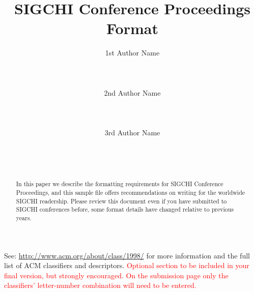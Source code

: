 \documentclass{sigchi}
\begin{document}
\title{SIGCHI Conference Proceedings Format}

\author{
  \alignauthor 1st Author Name\\
    \\
    \\
    \\
  \alignauthor 2nd Author Name\\
    \\
    \\
    \\
  \alignauthor 3rd Author Name\\
    \\
    \\
    \\
}

\maketitle

\begin{abstract}
In this paper we describe the formatting requirements for
SIGCHI Conference Proceedings, and this sample file
offers recommendations on writing for the worldwide
SIGCHI readership. Please review this document even if
you have submitted to SIGCHI conferences before, some
format details have changed relative to previous years.
\end{abstract}



See: \url{http://www.acm.org/about/class/1998/}
for more information and the full list of ACM classifiers
and descriptors. \newline
\textcolor{red}{Optional section to be included in your final version, 
but strongly encouraged. On the submission page only the classifiers’ 
letter-number combination will need to be entered.}
\end{document}
